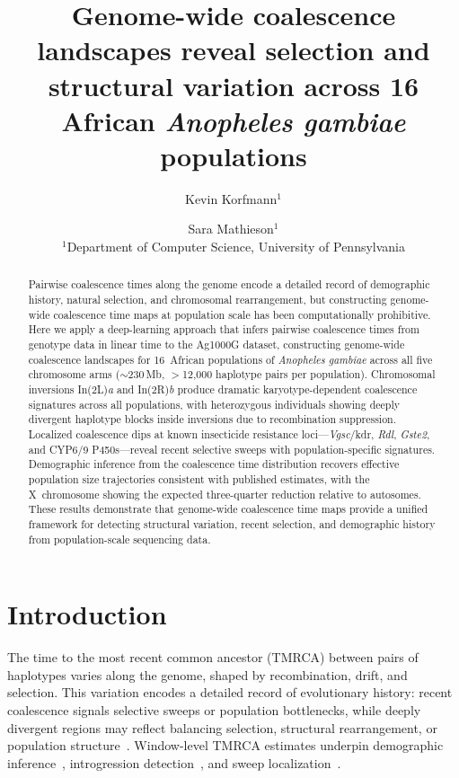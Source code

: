 \documentclass[10pt]{article}
\title{Genome-wide coalescence landscapes reveal selection and structural
variation across 16 African \textit{Anopheles gambiae} populations}
\author{
  Kevin Korfmann$^{1}$ \and Sara Mathieson$^{1}$ \\
  $^{1}$Department of Computer Science, University of Pennsylvania
}
\begin{document}
\maketitle


\begin{abstract}
Pairwise coalescence times along the genome encode a detailed record of
demographic history, natural selection, and chromosomal rearrangement, but
constructing genome-wide coalescence time maps at population scale has been
computationally prohibitive. Here we apply a deep-learning approach that
infers pairwise coalescence times from genotype data in linear time to the
Ag1000G dataset, constructing genome-wide coalescence landscapes for
16~African populations of \textit{Anopheles gambiae} across all five
chromosome arms ($\sim$230\,Mb, $>$12{,}000 haplotype pairs per population).
Chromosomal inversions In(2L)\textit{a} and In(2R)\textit{b} produce dramatic
karyotype-dependent coalescence signatures across all populations, with
heterozygous individuals showing deeply divergent haplotype blocks inside
inversions due to recombination suppression. Localized coalescence dips at
known insecticide resistance loci---\textit{Vgsc}/kdr, \textit{Rdl},
\textit{Gste2}, and CYP6/9 P450s---reveal recent selective sweeps with
population-specific signatures. Demographic inference from the coalescence
time distribution recovers effective population size trajectories consistent
with published estimates, with the X~chromosome showing the expected
three-quarter reduction relative to autosomes. These results demonstrate that
genome-wide coalescence time maps provide a unified framework for detecting
structural variation, recent selection, and demographic history from
population-scale sequencing data.
\end{abstract}


\section*{Introduction}

The time to the most recent common ancestor (TMRCA) between pairs of
haplotypes varies along the genome, shaped by recombination, drift, and
selection. This variation encodes a detailed record of evolutionary
history: recent coalescence signals selective sweeps or population
bottlenecks, while deeply divergent regions may reflect balancing selection,
structural rearrangement, or population
structure~\citep{schiffels2014inferring}. Window-level TMRCA estimates
underpin demographic inference~\citep{li2011inference}, introgression
detection~\citep{racimo2017signatures}, and sweep
localization~\citep{stern2019approximate}.
\end{document}
